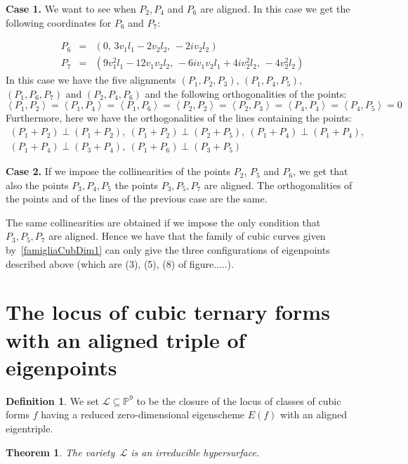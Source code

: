 \documentclass[12pt, a4paper, reqno, captions=tableheading,bibliography=totoc]{scrartcl}
\theoremstyle{plain}
\newtheorem{theorem}[lemma]{Theorem}
\theoremstyle{definition}
\newtheorem{definition}[lemma]{Definition}
\newcommand{\p}{\mathbb{P}}
\newcommand{\imunit}{i}
\newcommand{\scl}[2]{\left\langle {#1}, {#2} \right\rangle}
\begin{document}
\textbf{Case 1.} We want to see when $P_2, P_4$ and $P_6$ are aligned.
In this case we get the following coordinates for $P_6$ and $P_7$:

\begin{eqnarray*}
  P_6 & = & \left(0,\,3 v_{1} l_{1} - 2 v_{2} l_{2},
  \,-2 \imunit v_{2} l_{2}\right)\\
  P_7 & = & \left(9 v_{1}^{2} l_{1} - 12 v_{1} v_{2} l_{2},
  \,-6 \imunit v_{1} v_{2} l_{1} + 4 \imunit v_{2}^{2} l_{2},
  \,-4 v_{2}^{2} l_{2}\right)
\end{eqnarray*}
In this case we have the five alignments $(P_1, P_2, P_3)$, $(P_1, P_4, P_5)$,
$(P_1, P_6, P_7)$ and $(P_2, P_4, P_6)$ and the following orthogonalities
of the points:
\[
\scl{P_1}{P_2} = \scl{P_1}{P_4} = \scl{P_1}{P_6} =
\scl{P_2}{P_2} = \scl{P_2}{P_3} = \scl{P_4}{P_4} =
\scl{P_4}{P_5} = 0
\]
Furthermore, here we have the orthogonalities of the lines containing
the points:
\[
\begin{array}{l}
(P_1+P_2) \perp (P_1+P_2), \ (P_1+P_2) \perp (P_2+P_5), \
  (P_1+P_4) \perp (P_1+P_4), \\
  (P_1+P_4) \perp (P_3+P_4), \ (P_1+P_6) \perp (P_3+P_5)
\end{array}
  \]

  \textbf{Case 2.} If we impose the collinearities of the points
  $P_2$, $P_5$ and $P_6$, we get that also the points $P_3, P_4, P_5$
  the points $P_3, P_5, P_7$ are aligned. The orthogonalities of the
  points and of the lines of the previous case are the same.

  The same collinearities are obtained if we impose the only condition
  that $P_3, P_5, P_7$ are aligned. Hence we have that the family of
  cubic curves given by~\ref{famigliaCubDim1} can only give the
  three configurations of eigenpoints described above (which are
  (3), (5), (8) of figure.....).

\section{The locus of cubic ternary forms with an aligned triple of eigenpoints}

\begin{definition}
 We set $\mathcal{L} \subseteq \p^9$ to be the closure of the locus of classes of cubic forms $f$ having a reduced zero-dimensional eigenscheme $E(f)$ with an aligned eigentriple.
\end{definition}

\begin{theorem}
The variety~$\mathcal{L}$ is an irreducible hypersurface.
\end{theorem}
\end{document}
